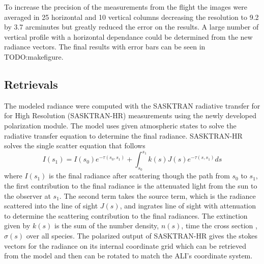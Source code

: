 \documentclass[12pt, draft]{article}
\begin{document}
To increase the precision of the measurements from the flight the images were averaged in 25 horizontal and 10 vertical columns decreasing the resolution to 9.2 by 3.7 arcminutes but greatly reduced the error on the results. A large number of vertical profile with a horizontal dependance could be determined from the new radiance vectors. The final results with error bars can be seen in TODO:makefigure.

\subsection{Retrievals}

The modeled radiance were computed with the SASKTRAN radiative transfer for for High Resolution (SASKTRAN-HR) measurements using the newly developed polarization module. The model uses given atmospheric states to solve the radiative transfer equation to determine the final radiance. SASKTRAN-HR solves the single scatter equation that follows \begin{equation}
    I(s_{1}) = I(s_{0})e^{-\tau(s_{0}, s_{1})}+\int^{s_{1}}_{s_{0}}k(s)J(s)e^{-\tau(s, s_{1})}ds
\end{equation}
where $I(s_{1})$ is the final radiance after scattering though the path from $s_{0}$ to $s_{1}$, the first contribution to the final radiance is the attenuated light from the sun to the observer at $s_{1}$. The second term takes the source term, which is the radiance scattered into the line of sight $J(s)$, and ingrates line of sight with attenuation to determine the scattering contribution to the final radiances. The extinction given by $k(s)$ is the sum of the number density, $n(s)$, time the cross section , $\sigma(s)$ over all species. The polarized output of SASKTRAN-HR gives the stokes vectors for the radiance on its internal coordinate grid which can be retrieved from the model and then can be rotated to match the ALI's coordinate system.
\end{document}
